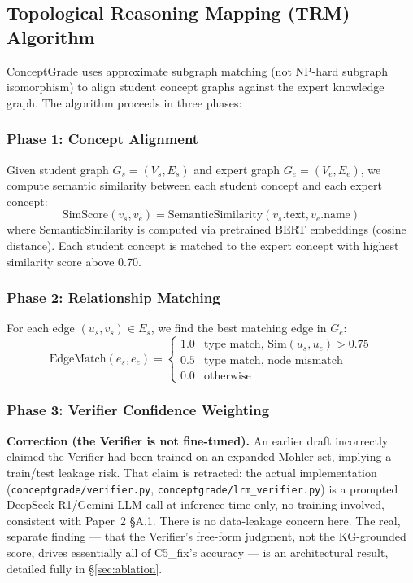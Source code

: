 \documentclass[conference]{IEEEtran}
\begin{document}
\subsection{Topological Reasoning Mapping (TRM) Algorithm}
\label{subsec:trm_algorithm}

ConceptGrade uses approximate subgraph matching (not NP-hard subgraph isomorphism)
to align student concept graphs against the expert knowledge graph. The algorithm
proceeds in three phases:

\subsubsection{Phase 1: Concept Alignment}

Given student graph $G_s = (V_s, E_s)$ and expert graph $G_e = (V_e, E_e)$,
we compute semantic similarity between each student concept and each expert concept:
\begin{equation}
  \text{SimScore}(v_s, v_e) = \text{SemanticSimilarity}(v_s.\text{text}, v_e.\text{name})
  \label{eq:concept_sim}
\end{equation}
where SemanticSimilarity is computed via pretrained BERT embeddings (cosine distance).
Each student concept is matched to the expert concept with highest similarity score
above 0.70.

\subsubsection{Phase 2: Relationship Matching}

For each edge $(u_s, v_s) \in E_s$, we find the best matching edge in $G_e$:
\begin{equation}
  \text{EdgeMatch}(e_s, e_e) =
  \begin{cases}
    1.0 & \text{type match, } \mathrm{Sim}(u_s,u_e)\!>\!0.75 \\
    0.5 & \text{type match, node mismatch} \\
    0.0 & \text{otherwise}
  \end{cases}
  \label{eq:edge_match}
\end{equation}

\subsubsection{Phase 3: Verifier Confidence Weighting}

\textbf{Correction (the Verifier is not fine-tuned).} An earlier draft
incorrectly claimed the Verifier had been trained on an expanded Mohler
set, implying a train/test leakage risk. That claim is retracted: the
actual implementation (\texttt{conceptgrade/verifier.py},
\texttt{conceptgrade/lrm\_verifier.py}) is a prompted
DeepSeek-R1/Gemini LLM call at inference time only, no training
involved, consistent with Paper~2 §A.1. There is no data-leakage
concern here. The real, separate finding --- that the Verifier's
free-form judgment, not the KG-grounded score, drives essentially all
of C5\_fix's accuracy --- is an architectural result, detailed fully in
\S\ref{sec:ablation}.
\end{document}
